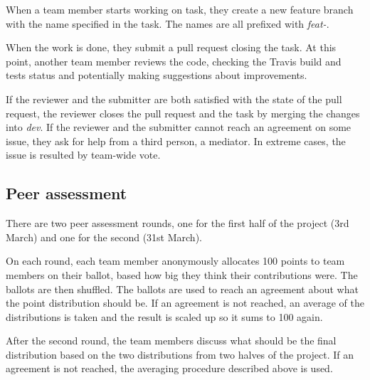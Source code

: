\documentclass[a4paper,12pt]{article}
\begin{document}
When a team member starts working on task, they create a new feature branch with the name specified in the task. The names are all prefixed with \emph{feat-}. 

When the work is done, they submit a pull request closing the task. At this point, another team member reviews the code, checking the Travis build and tests status and potentially making suggestions about improvements.

If the reviewer and the submitter are both satisfied with the state of the pull request, the reviewer closes the pull request and the task by merging the changes into \emph{dev}. If the reviewer and the submitter cannot reach an agreement on some issue, they ask for help from a third person, a mediator. In extreme cases, the issue is resulted by team-wide vote.

\subsection{Peer assessment}
There are two peer assessment rounds, one for the first half of the project (3rd March) and one for the second (31st March).

On each round, each team member anonymously allocates 100 points to team members on their ballot, based how big they think their contributions were. The ballots are then shuffled. The ballots are used to reach an agreement about what the point distribution should be. If an agreement is not reached, an average of the distributions is taken and the result is scaled up so it sums to 100 again.

After the second round, the team members discuss what should be the final distribution based on the two distributions from two halves of the project. If an agreement is not reached, the averaging procedure described above is used.
\end{document}

